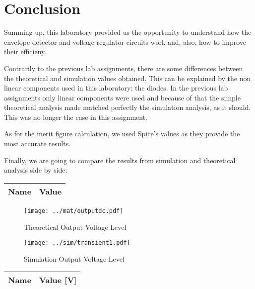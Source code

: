 \section{Conclusion}
\label{sec:conclusion}

Summing up, this laboratory provided us the opportunity to understand how the envelope detector and voltage regulator circuits work and, also, how to improve their efficieny.\par
Contrarily to the previous lab assignments, there are some differences between the theoretical and simulation values obtained. This can be explained by the non linear components used in this laboratory: the diodes. In the previous lab assignments only linear components were used and because of that the simple theoretical analysis made matched perfectly the simulation analysis, as it should. This was no longer the case in this assignment. \par
As for the merit figure calculation, we used Spice's values as they provide the most accurate results. \par
Finally, we are going to compare the results from simulation and theoretical analysis side by side: \par

\begin{center}
  \begin{tabular}{ | c | c | }
    \hline    
    {\bf Name} & {\bf Value} \\ \hline
    
    \hline
  \end{tabular}
\end{center}

\begin{figure}[H]
      \texttt{[image: ../mat/outputdc.pdf]}
      \caption{Theoretical Output Voltage Level}
    \endminipage\hfill
      \texttt{[image: ../sim/transient1.pdf]}
      \caption{Simulation Output Voltage Level}
    \endminipage\hfill
\end{figure}

\begin{center}
  \begin{tabular}{ | c | c | }
    \hline    
    {\bf Name} & {\bf Value [V]} \\ \hline
    
  \end{tabular}
\end{center}

